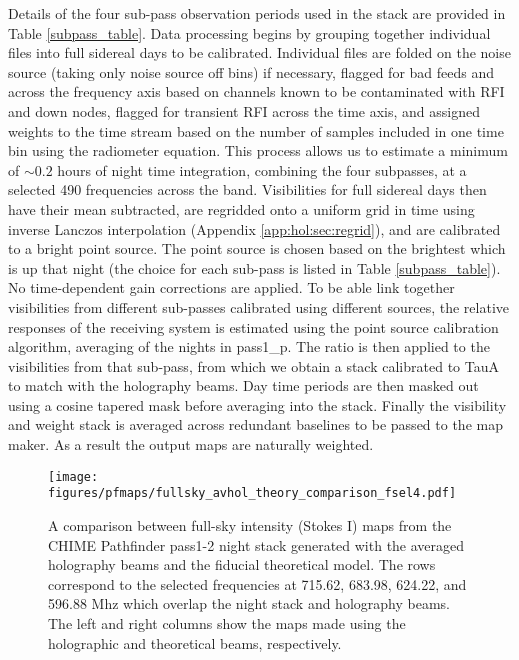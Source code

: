 Details of the four sub-pass observation periods used in the stack are provided in Table \ref{subpass_table}. Data processing begins by grouping together individual files into full sidereal days to be calibrated. Individual files are folded on the noise source (taking only noise source off bins) if necessary, flagged for bad feeds and across the frequency axis based on channels known to be contaminated with RFI and down nodes, flagged for transient RFI across the time axis, and assigned weights to the time stream based on the number of samples included in one time bin using the radiometer equation. This process allows us to estimate a minimum of $\sim 0.2$ hours of night time integration, combining the four subpasses, at a selected 490 frequencies across the band. Visibilities for full sidereal days then have their mean subtracted, are regridded onto a uniform grid in time using inverse Lanczos interpolation (Appendix \ref{app:hol:sec:regrid}), and are calibrated to a bright point source. The point source is chosen based on the brightest which is up that night (the choice for each sub-pass is listed in Table \ref{subpass_table}). No time-dependent gain corrections are applied. To be able link together visibilities from different sub-passes calibrated using different sources, the relative responses of the receiving system is estimated using the point source calibration algorithm, averaging of the nights in pass1\_p. The ratio is then applied to the visibilities from that sub-pass, from which we obtain a stack calibrated to TauA to match with the holography beams. Day time periods are then masked out using a cosine tapered mask before averaging into the stack. Finally the visibility and weight stack is averaged across redundant baselines to be passed to the map maker. As a result the output maps are naturally weighted.

\begin{figure}
\centering
\texttt{[image: figures/pfmaps/fullsky\_avhol\_theory\_comparison\_fsel4.pdf]}
\caption{A comparison between full-sky intensity (Stokes I) maps from the CHIME Pathfinder pass1-2 night stack generated with the averaged holography beams and the fiducial theoretical model. The rows correspond to the selected frequencies at 715.62, 683.98, 624.22, and 596.88 Mhz which overlap the night stack and holography beams. The left and right columns show the maps made using the holographic and theoretical beams, respectively.}
\label{fullsky_comparison}
\end{figure}

